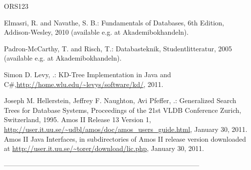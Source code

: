 \documentclass[12pt]{article}
\begin{document}
\begin{thebibliography}{ORS123}
%


 Elmasri, R. and Navathe, S. B.: Fundamentals of Databases, 6th Edition, Addison-Wesley, 2010 (available e.g. at Akademibokhandeln).

 Padron-McCarthy, T. and Risch, T.: Databasteknik, Studentlitteratur, 2005 (available e.g. at Akademibokhandeln).

 Simon D. Levy, .: KD-Tree Implementation in Java and C\#,\url{http://home.wlu.edu/~levys/software/kd/}, 2011.

 Joseph M. Hellerstein, Jeffrey F. Naughton, Avi Pfeffer, .: Generalized Search Trees for Database Systems, Proceedings of the 21st VLDB Conference Zurich, Switzerland, 1995.
 Amos II Release 13 Version 1, \url{http://user.it.uu.se/~udbl/amos/doc/amos_users_guide.html}, January 30,  2011.
 Amos II Java Interfaces, in subdirectories of Amos II release version downloaded at \url{http://user.it.uu.se/~torer/download/lic.php}, January 30,  2011.


\end{thebibliography}


%
%


\begin{center}
--------------------------------------------------------------------------------------\\
\end{center}
\end{document}
